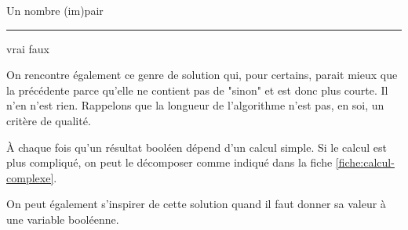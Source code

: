 \begin{Fiche}{Un nombre (im)pair}
	\hfil\rule{0.5\textwidth}{.4pt}\hfil

	\begin{minipage}{7.5cm}
		\begin{LDA}
				\Return vrai
			\EndIf
			\Return faux
		\EndAlgo
		\end{LDA}
	\end{minipage}
	\quad
	\begin{minipage}{6cm}
		On rencontre également ce genre de solution
		qui, pour certains, 
		parait mieux que la précédente 
		parce qu'elle ne contient pas de "sinon"
		et est donc plus courte.
		Il n'en n'est rien.
		Rappelons que la longueur de l'algorithme
		n'est pas, en soi, un critère de qualité. 
	\end{minipage}
	

	À chaque fois qu'un résultat booléen dépend d'un calcul simple.
	Si le calcul est plus compliqué, on peut le décomposer comme
	indiqué dans la fiche \vref{fiche:calcul-complexe}.
	
	On peut également s'inspirer de cette solution
	quand il faut donner sa valeur à une variable booléenne.
		
\end{Fiche}
